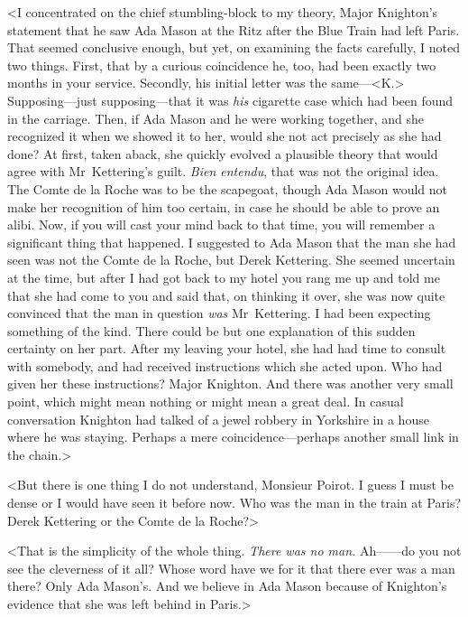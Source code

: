 <I concentrated on the chief stumbling-block to my theory, Major Knighton's statement that he saw Ada Mason at the Ritz after the Blue Train had left Paris. That seemed conclusive enough, but yet, on examining the facts carefully, I noted two things. First, that by a curious coincidence he, too, had been exactly two months in your service. Secondly, his initial letter was the same—<K.> Supposing—just supposing—that it was \emph{his} cigarette case which had been found in the carriage. Then, if Ada Mason and he were working together, and she recognized it when we showed it to her, would she not act precisely as she had done? At first, taken aback, she quickly evolved a plausible theory that would agree with Mr~Kettering's guilt. \emph{Bien entendu}, that was not the original idea. The Comte de la Roche was to be the scapegoat, though Ada Mason would not make her recognition of him too certain, in case he should be able to prove an alibi. Now, if you will cast your mind back to that time, you will remember a significant thing that happened. I suggested to Ada Mason that the man she had seen was not the Comte de la Roche, but Derek Kettering. She seemed uncertain at the time, but after I had got back to my hotel you rang me up and told me that she had come to you and said that, on thinking it over, she was now quite convinced that the man in question \emph{was} Mr~Kettering. I had been expecting something of the kind. There could be but one explanation of this sudden certainty on her part. After my leaving your hotel, she had had time to consult with somebody, and had received instructions which she acted upon. Who had given her these instructions? Major Knighton. And there was another very small point, which might mean nothing or might mean a great deal. In casual conversation Knighton had talked of a jewel robbery in Yorkshire in a house where he was staying. Perhaps a mere coincidence—perhaps another small link in the chain.>

<But there is one thing I do not understand, Monsieur Poirot. I guess I must be dense or I would have seen it before now. Who was the man in the train at Paris? Derek Kettering or the Comte de la Roche?>

<That is the simplicity of the whole thing. \emph{There was no man.} Ah——do you not see the cleverness of it all? Whose word have we for it that there ever was a man there? Only Ada Mason's. And we believe in Ada Mason because of Knighton's evidence that she was left behind in Paris.>

